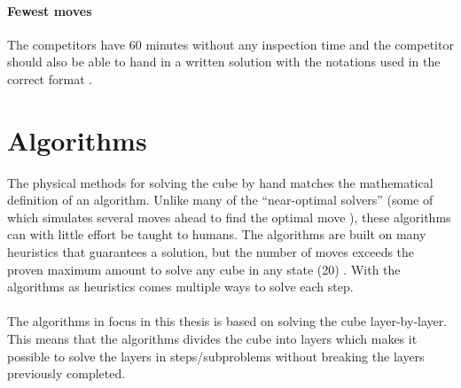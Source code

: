 \documentclass[a4paper,11pt]{kth-mag}
\begin{document}
\paragraph{Fewest moves}
The competitors have 60 minutes without any inspection time and the competitor should also be able to hand in a written solution with the notations used in the correct format \cite{WCA2}.
\section{Algorithms}
The physical methods for solving the cube by hand matches the mathematical definition of an algorithm. Unlike many of the “near-optimal solvers” (some of which simulates several moves ahead to find the optimal move \cite{Kociemba}), these algorithms can with little effort be taught to humans. The algorithms are built on many heuristics that guarantees a solution, but the number of moves exceeds the proven maximum amount to solve any cube in any state (20) \cite{cube20}. With the algorithms as heuristics comes multiple ways to solve each step.\\\\
The algorithms in focus in this thesis is based on solving the cube layer-by-layer. This means that the algorithms divides the cube into layers which makes it possible to solve the layers in steps/subproblems without breaking the layers previously completed.
\end{document}
